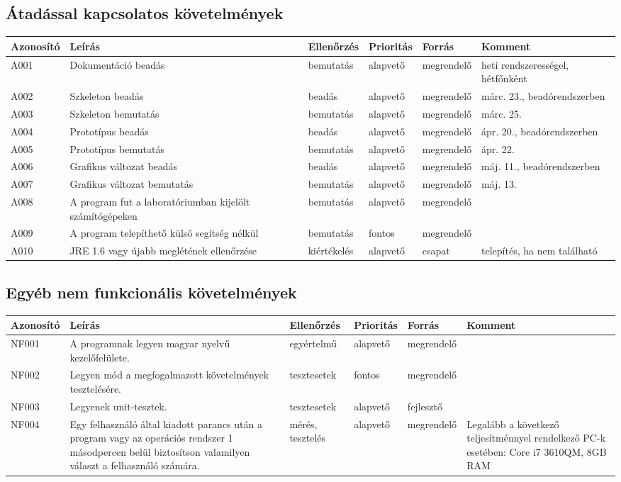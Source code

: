 \subsection{Átadással kapcsolatos követelmények}

\begin{tabularx}{\linewidth}{| l | X | l | l | l | X |}
\hline
\textbf{Azonosító}   & \textbf{Leírás} & \textbf{Ellenőrzés} & \textbf{Prioritás} & \textbf{Forrás} & \textbf{Komment} \tabularnewline
\hline\hline
\endhead
A001 & Dokumentáció beadás & bemutatás & alapvető & megrendelő & heti rendszerességel, hétfőnként \tabularnewline \hline
A002 & Szkeleton beadás & beadás & alapvető & megrendelő & márc. 23., beadórendszerben \tabularnewline \hline
A003 & Szkeleton bemutatás & bemutatás & alapvető & megrendelő & márc. 25. \tabularnewline \hline
A004 & Prototípus beadás & beadás & alapvető & megrendelő & ápr. 20., beadórendszerben \tabularnewline \hline
A005 & Prototípus bemutatás & bemutatás & alapvető & megrendelő & ápr. 22.  \tabularnewline \hline
A006 & Grafikus változat beadás & beadás & alapvető & megrendelő & máj. 11., beadórendszerben  \tabularnewline \hline
A007 & Grafikus változat bemutatás & bemutatás & alapvető & megrendelő & máj. 13. \tabularnewline \hline
A008 & A program fut a laboratóriumban kijelölt számítógépeken & bemutatás & alapvető & megrendelő & \tabularnewline \hline
A009 & A program telepíthető külső segítség nélkül & bemutatás & fontos & megrendelő & \tabularnewline \hline
A010 & JRE 1.6 vagy újabb meglétének ellenőrzése & kiértékelés & alapvető & csapat & telepítés, ha nem található \tabularnewline \hline
\end{tabularx}

\subsection{Egyéb nem funkcionális követelmények}

\begin{tabularx}{\linewidth}{| l | X | l | l | l | X |}
\hline
\textbf{Azonosító}   & \textbf{Leírás} & \textbf{Ellenőrzés} & \textbf{Prioritás} & \textbf{Forrás} & \textbf{Komment} \tabularnewline
\hline\hline
\endhead
NF001 & A programnak legyen magyar nyelvű kezelőfelülete. & egyértelmű & alapvető & megrendelő & \tabularnewline \hline
NF002 & Legyen mód a megfogalmazott követelmények tesztelésére. & tesztesetek & fontos & megrendelő & \tabularnewline \hline
NF003 & Legyenek unit-tesztek. & tesztesetek & alapvető & fejlesztő &  \tabularnewline \hline
NF004 & Egy felhasználó által kiadott parancs után a program vagy az operációs rendszer 1 másodpercen belül biztosítson valamilyen választ a felhasználó számára.  & mérés, tesztelés & alapvető & megrendelő & Legalább a következő teljesítménnyel rendelkező PC-k esetében: Core i7 3610QM, 8GB RAM \tabularnewline \hline

	
\end{tabularx}


